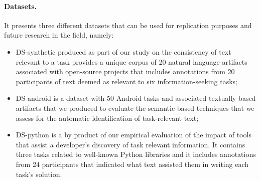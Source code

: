 
\paragraph{\textbf{Datasets.}} 

It presents three different datasets that can be used for replication purposes and future research in the field, namely:
    
\begin{itemize}
    \item \acs{DS-synthetic} produced as part of our study on the consistency of text relevant to a task provides a unique corpus of 20 natural language artifacts associated
    with open-source projects that includes annotations from 20 participants of text deemed as relevant to six information-seeking tasks;
    
    \item \acs{DS-android} is a dataset with 50 Android tasks and associated textually-based artifacts 
    that we produced to evaluate the semantic-based techniques that we assess for the automatic identification of  task-relevant text;

    \item \acs{DS-python} is a by product of our empirical evaluation of the impact of tools that assist a developer's discovery of task relevant information.
    It contains three tasks related to well-known Python libraries and it includes annotations from 24 participants that indicated what text assisted them in writing each task's solution.
\end{itemize}